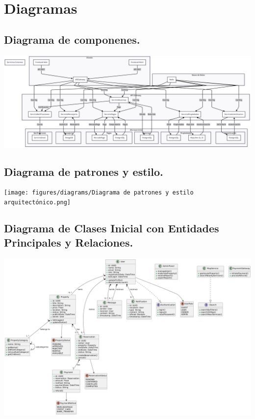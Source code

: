 \section{Diagramas}
	\subsection{Diagrama de componenes.}
	\begin{center}
		\includegraphics[width=\linewidth]{figures/diagrams/Diagrama conceptual del sistema.png}
		\label{fig:img90}
	\end{center}
	\subsection{Diagrama de patrones y estilo.}
	\begin{center}
		\texttt{[image: figures/diagrams/Diagrama de patrones y estilo arquitectónico.png]}
		\label{fig:img100}
	\end{center}
	\subsection{Diagrama de Clases Inicial con Entidades Principales y Relaciones.}
	\begin{center}
		\includegraphics[width=\linewidth]{figures/diagrams/Diagrama de Clases.png}
		\label{fig:img110}
	\end{center}